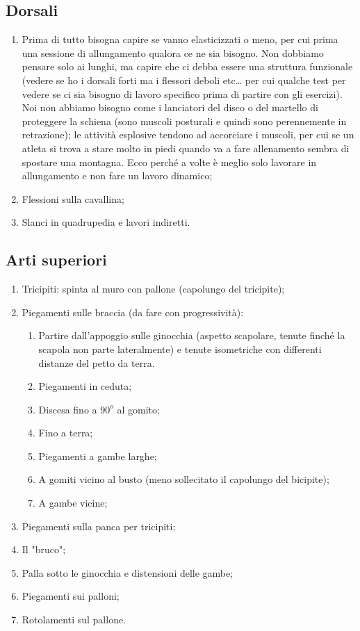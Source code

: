 \subsection{Dorsali}
\begin{enumerate}
\item Prima di tutto bisogna capire se vanno elasticizzati o meno, per cui prima una sessione di
allungamento qualora ce ne sia bisogno. Non dobbiamo pensare solo ai lunghi, ma capire che ci
debba essere una struttura funzionale (vedere se ho i dorsali forti ma i flessori deboli etc… per cui
qualche test per vedere se ci sia bisogno di lavoro specifico prima di partire con gli esercizi). Noi
non abbiamo bisogno come i lanciatori del disco o del martello di proteggere la schiena (sono
muscoli posturali e quindi sono perennemente in retrazione); le attività esplosive tendono ad
accorciare i muscoli, per cui se un atleta si trova a stare molto in piedi quando va a fare
allenamento sembra di spostare una montagna. Ecco perché a volte è meglio solo lavorare in
allungamento e non fare un lavoro dinamico;
\item Flessioni sulla cavallina;
\item Slanci in quadrupedia e lavori indiretti.
\end{enumerate}
\subsection{Arti superiori}
\begin{enumerate}
\item Tricipiti: spinta al muro con pallone (capolungo del tricipite);
\item Piegamenti sulle braccia (da fare con progressività):
\begin{enumerate}
\item Partire dall'appoggio sulle ginocchia (aspetto scapolare, tenute finché la scapola non parte
lateralmente) e tenute isometriche con differenti distanze del petto da terra.
\item Piegamenti in ceduta;
\item Discesa fino a $90^{o}$ al gomito;
\item Fino a terra;
\item Piegamenti a gambe larghe;
\item A gomiti vicino al busto (meno sollecitato il capolungo del bicipite);
\item A gambe vicine;
\end{enumerate}
\item Piegamenti sulla panca per tricipiti;
\item Il "bruco";
\item Palla sotto le ginocchia e distensioni delle gambe;
\item Piegamenti sui palloni;
\item Rotolamenti sul pallone.
\end{enumerate}

